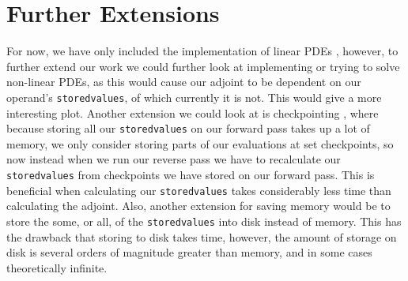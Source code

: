 \documentclass{article}
\begin{document}
\newpage

\section{Further Extensions}

For now, we have only included the implementation of linear PDEs \cite{github}, however, to further extend our work we could further look at implementing or trying to solve non-linear PDEs, as this would cause our adjoint to be dependent on our operand's \verb|storedvalues|, of which currently it is not. This would give a more interesting plot. Another extension we could look at is checkpointing \cite{checkpoint}, where because storing all our \verb|storedvalues| on our forward pass takes up a lot of memory, we only consider storing parts of our evaluations at set checkpoints, so now instead when we run our reverse pass we have to recalculate our \verb|storedvalues| from checkpoints we have stored on our forward pass. This is beneficial when calculating our \verb|storedvalues| takes considerably less time than calculating the adjoint. Also, another extension for saving memory would be to store the some, or all, of the \verb|storedvalues| into disk instead of memory. This has the drawback that storing to disk takes time, however, the amount of storage on disk is several orders of magnitude greater than memory, and in some cases theoretically infinite.


\end{document}
